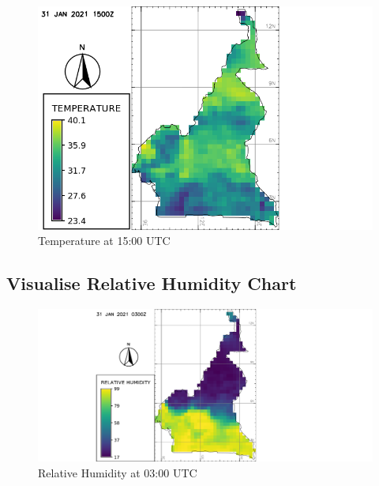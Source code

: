 \begin{figure}[H]
\begin{center}
\includegraphics[scale=0.6]{tp15a.png} %
\end{center}
\caption{Temperature at 15:00 UTC}
\label{Temperature at 15:00 UTC}%
\end{figure}

\subsection{Visualise Relative Humidity Chart}
\begin{figure}[H]
\begin{center}
\includegraphics[scale=0.4]{rh3a.png} %
\end{center}
\caption{Relative Humidity at 03:00 UTC}
\label{Relative Humidity at 03:00 UTC}%
\end{figure}

